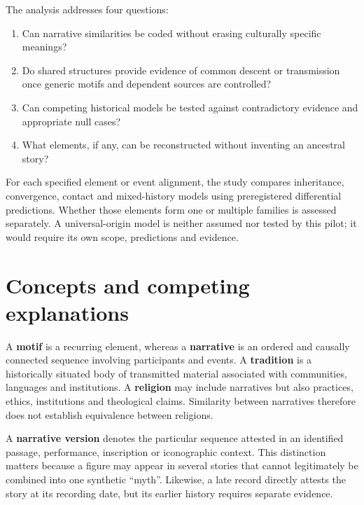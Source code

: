 \documentclass[11pt]{article}
\DeclareRobustCommand{\_}{\textunderscore\allowbreak}
\begin{document}
The analysis addresses four questions:
\begin{enumerate}[label=\arabic*.]
  \item Can narrative similarities be coded without erasing culturally specific
        meanings?
  \item Do shared structures provide evidence of common descent or transmission
        once generic motifs and dependent sources are controlled?
  \item Can competing historical models be tested against contradictory evidence
        and appropriate null cases?
  \item What elements, if any, can be reconstructed without inventing an
        ancestral story?
\end{enumerate}
For each specified element or event alignment, the study compares inheritance,
convergence, contact and mixed-history models using preregistered differential
predictions. Whether those elements form one or multiple families is assessed
separately. A universal-origin model is neither assumed nor tested by this pilot;
it would require its own scope, predictions and evidence.

\section{Concepts and competing explanations}

A \textbf{motif} is a recurring element, whereas a \textbf{narrative} is an
ordered and causally connected sequence involving participants and events. A
\textbf{tradition} is a historically situated body of transmitted material
associated with communities, languages and institutions. A \textbf{religion} may
include narratives but also practices, ethics, institutions and theological
claims. Similarity between narratives therefore does not establish equivalence
between religions.

A \textbf{narrative version} denotes the particular sequence attested in an
identified passage, performance, inscription or iconographic context. This
distinction matters because a figure may appear in several stories that cannot
legitimately be combined into one synthetic ``myth''. Likewise, a late record
directly attests the story at its recording date, but its earlier history
requires separate evidence.
\end{document}
